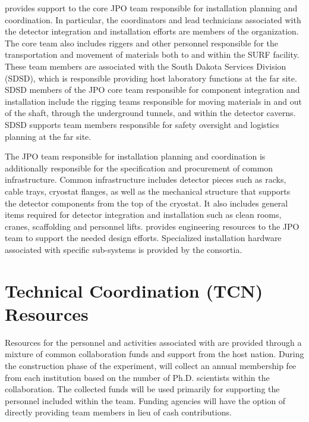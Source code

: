   provides support to the core JPO team
responsible for installation planning and coordination.  In
particular, the coordinators and lead technicians associated with the
detector integration and installation efforts are members of the
 organization.  The core team also includes
riggers and other personnel responsible for the transportation and
movement of materials both to and within the SURF facility.  These
team members are associated with the South Dakota Services Division
(SDSD), which is responsible providing host laboratory functions at
the far site.  SDSD members of the JPO core team responsible for
component integration and installation include the rigging teams
responsible for moving materials in and out of the shaft, through the
underground tunnels, and within the detector caverns.  SDSD 
supports team members responsible for safety oversight and logistics
planning at the far site.

The JPO team responsible for installation planning and coordination is
additionally responsible for the specification and procurement of
common infrastructure.  Common infrastructure includes detector pieces
such as racks, cable trays, cryostat flanges, as well as the
mechanical structure that supports the detector components from the
top of the cryostat.  It also includes general items required for
detector integration and installation such as clean rooms, cranes,
scaffolding and personnel lifts.  
provides engineering resources to the JPO team to support the needed
design efforts. Specialized installation hardware associated with
specific sub-systems is provided by the consortia.

\section{Technical Coordination (TCN) Resources}
\label{sec:tc_resources}

Resources for the personnel and activities associated with 
are provided through a mixture of common collaboration funds and
support from the host nation.  During the construction phase of the
experiment,  will collect an annual membership fee from
each institution based on the number of Ph.D. scientists within the
collaboration.  The collected funds will be used primarily for
supporting the personnel included within the  team.  Funding
agencies will have the option of directly providing team members in
lieu of cash contributions.

